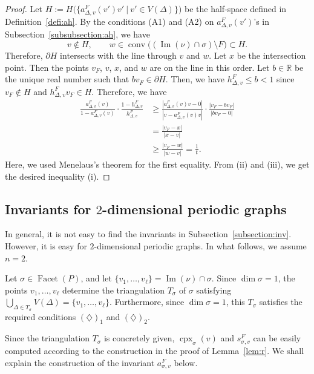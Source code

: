 \begin{proof}
Let $H := H \bigl( \bigl \{ a^{F} _{\Delta, v} (v') v' \ \big| \  v' \in V(\Delta) \bigr \} \bigr)$ be the half-space defined in Definition~\ref{defi:ah}. 
By the conditions (A1) and (A2) on $a^{F} _{\Delta, v} (v')$'s in Subsection~\ref{subsubsection:ah}, we have 
\[
v \not \in H, \qquad w \in \operatorname{conv} \bigl( (\operatorname{Im}(\nu) \cap \sigma ) \setminus F \bigr) \subset H. 
\]
Therefore, $\partial H$ intersects with the line through $v$ and $w$.
Let $x$ be the intersection point.  
Then the points $v_F$, $v$, $x$, and $w$ are on the line in this order. 
Let $b \in \mathbb{R}$ be the unique real number such that $bv_F \in \partial H$. 
Then, we have $h^F _{\Delta,v} \le b < 1$ since $v_F \not\in H$ and $h^F _{\Delta,v} v_F \in H$.
Therefore, we have
\begin{align*}\tag{iii}
	\frac{a_{\Delta,v}^F(v)}{1-a^F_{\Delta,v}(v)} \cdot \frac{1-h^F_{\Delta,v}}{h^F_{\Delta,v}}
	&\ge \frac{\left \lvert a_{\Delta,v}^F(v)v-0 \right \rvert}{\left \lvert v-a^F_{\Delta,v}(v)v \right \rvert} \cdot 
		\frac{\left \lvert v_F-bv_F \right \rvert}{\lvert bv_F-0 \rvert } \\
	&=\frac{\lvert v_F-x \rvert}{\lvert x-v \rvert} \\
	&\ge \frac{\lvert v_F-w \rvert}{\lvert w-v \rvert} = \frac{1}{t}. 
\end{align*}
Here, we used Menelaus's theorem for the first equality. 
From (ii) and (iii), we get the desired inequality (i). 
\end{proof}


\subsection{Invariants for \texorpdfstring{$2$}{2}-dimensional periodic graphs}\label{subsection:2dim}
In general, it is not easy to find the invariants in Subsection~\ref{subsection:inv}. 
However, it is easy for $2$-dimensional periodic graphs. 
In what follows, we assume $n = 2$. 


Let $\sigma \in \operatorname{Facet}(P)$, and let $\{ v_1, \ldots , v_{\ell} \} = \operatorname{Im}(\nu) \cap \sigma$. 
Since $\dim \sigma = 1$, the points $v_1, \ldots , v_{\ell}$ determine the triangulation $T_{\sigma}$ of $\sigma$ satisfying 
$\bigcup _{\Delta \in T_{\sigma}} V(\Delta) = \{ v_1, \ldots , v_{\ell} \}$. 
Furthermore, since $\dim \sigma = 1$, this $T_{\sigma}$ satisfies the required conditions $(\diamondsuit)_1$ and $(\diamondsuit)_2$. 

Since the triangulation $T_{\sigma}$ is concretely given, 
$\operatorname{cpx}_{\sigma} (v)$ and $s_{\sigma, v} ^F$ can be easily computed according to the construction in the proof of Lemma~\ref{lem:r}. 
We shall explain the construction of the invariant $a_{\sigma, v}^F$ below. 

